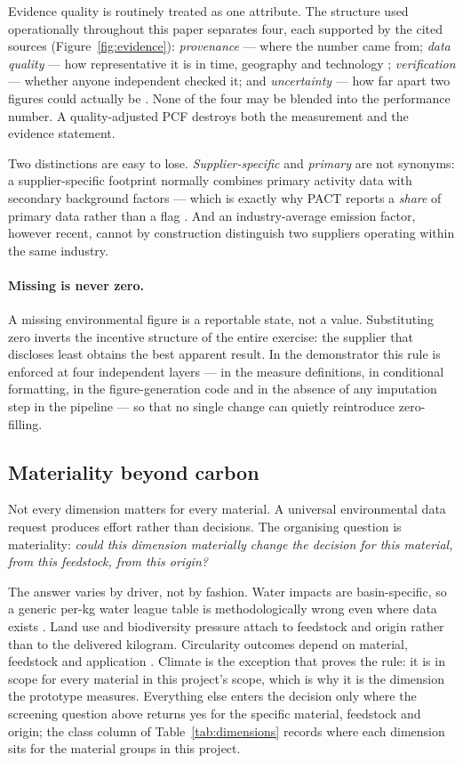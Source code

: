 \documentclass[10pt,twocolumn,a4paper]{article}
\begin{document}
Evidence quality is routinely treated as one attribute. The structure used
operationally throughout this paper separates four, each supported by the cited
sources (Figure~\ref{fig:evidence}): \emph{provenance} --- where the number came from;
\emph{data quality} --- how representative it is in time, geography and
technology \cite{a2}; \emph{verification} --- whether anyone independent checked
it; and \emph{uncertainty} --- how far apart two figures could actually be
\cite{p1}. None of the four may be blended into the performance number. A
quality-adjusted PCF destroys both the measurement and the evidence statement.

Two distinctions are easy to lose. \emph{Supplier-specific} and \emph{primary}
are not synonyms: a supplier-specific footprint normally combines primary
activity data with secondary background factors --- which is exactly why PACT
reports a \emph{share} of primary data rather than a flag \cite{p3,b2}. And an
industry-average emission factor, however recent, cannot by construction
distinguish two suppliers operating within the same industry.

\paragraph{Missing is never zero.} A missing environmental figure is a reportable
state, not a value. Substituting zero inverts the incentive structure of the
entire exercise: the supplier that discloses least obtains the best apparent
result. In the demonstrator this rule is enforced at four independent layers ---
in the measure definitions, in conditional formatting, in the figure-generation
code and in the absence of any imputation step in the pipeline --- so that no
single change can quietly reintroduce zero-filling.

\subsection{Materiality beyond carbon}
\label{sec:materiality}

Not every dimension matters for every material. A universal environmental data
request produces effort rather than decisions. The organising question is
materiality: \emph{could this dimension materially change the decision for this
material, from this feedstock, from this origin?}

The answer varies by driver, not by fashion. Water impacts are basin-specific, so
a generic per-kg water league table is methodologically wrong even where data
exists \cite{v3}. Land use and biodiversity pressure attach to feedstock and
origin rather than to the delivered kilogram. Circularity outcomes depend on
material, feedstock and application \cite{p2}. Climate is the exception that
proves the rule: it is in scope for every material in this project's scope, which
is why it is the dimension the prototype measures. Everything else enters the
decision only where the screening question above returns yes for the specific
material, feedstock and origin; the class column of
Table~\ref{tab:dimensions} records where each dimension sits for the material
groups in this project.
\end{document}

